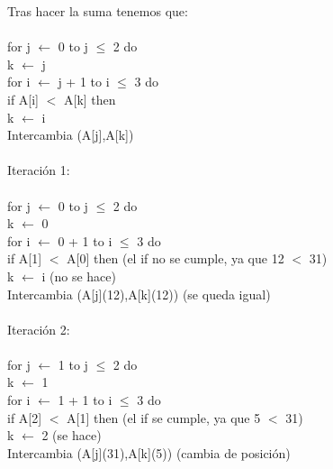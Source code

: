 \documentclass[12pt,twoside]{article}
\begin{document}
Tras hacer la suma tenemos que:\\\\
\hspace*{2cm}for j $\leftarrow$ 0 to j $\leq$ 2 do\\
\hspace*{3cm}k $\leftarrow$ j\\
\hspace*{4cm}for i $\leftarrow$ j + 1 to i $\leq$ 3 do\\
\hspace*{5cm}if A[i] $<$ A[k] then\\
\hspace*{6cm}k $\leftarrow$ i\\
\hspace*{3cm}Intercambia (A[j],A[k])\\\\
Iteraci\'on 1:\\\\
\hspace*{2cm}for j $\leftarrow$ 0 to j $\leq$ 2 do\\
\hspace*{3cm}k $\leftarrow$ 0\\
\hspace*{4cm}for i $\leftarrow$ 0 + 1 to i $\leq$ 3 do\\
\hspace*{4.2cm}if A[1] $<$ A[0] then (el if no se cumple, ya que 12 $<$ 31)\\
\hspace*{6cm}k $\leftarrow$ i (no se hace)\\
\hspace*{3cm}Intercambia (A[j](12),A[k](12)) (se queda igual)\\\\
Iteraci\'on 2:\\\\
\hspace*{2cm}for j $\leftarrow$ 1 to j $\leq$ 2 do\\
\hspace*{3cm}k $\leftarrow$ 1\\
\hspace*{4cm}for i $\leftarrow$ 1 + 1 to i $\leq$ 3 do\\
\hspace*{4.2cm}if A[2] $<$ A[1] then (el if se cumple, ya que 5 $<$ 31)\\
\hspace*{6cm}k $\leftarrow$ 2 (se hace)\\
\hspace*{3cm}Intercambia (A[j](31),A[k](5)) (cambia de posici\'on)\\\\
\end{document}
